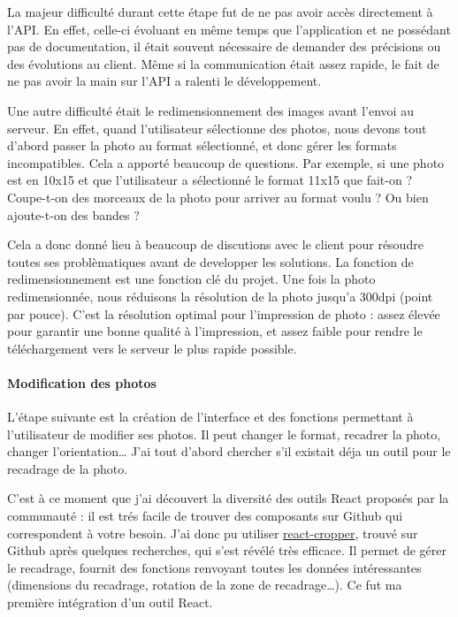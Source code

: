 \documentclass[12pt,a4paper]{article}
\begin{document}
  \bigskip

  La majeur difficulté durant cette étape fut de ne pas avoir accès
  directement à l'API. En effet, celle-ci évoluant en même temps que
  l'application et ne possédant pas de documentation, il était souvent
  nécessaire de demander des précisions ou des évolutions au client. Même
  si la communication était assez rapide, le fait de ne pas avoir la main
  sur l'API a ralenti le développement.

  \bigskip

  Une autre difficulté était le redimensionnement des images avant l'envoi
  au serveur. En effet, quand l'utilisateur sélectionne des photos, nous
  devons tout d'abord passer la photo au format sélectionné, et donc gérer
  les formats incompatibles. Cela a apporté beaucoup de questions. Par
  exemple, si une photo est en 10x15 et que l'utilisateur a sélectionné le
  format 11x15 que fait-on ? Coupe-t-on des morceaux de la photo pour
  arriver au format voulu ? Ou bien ajoute-t-on des bandes ?

  \bigskip

  Cela a donc donné lieu à beaucoup de discutions avec le client pour
  résoudre toutes ses problèmatiques avant de developper les solutions. La
  fonction de redimensionnement est une fonction clé du projet. Une fois
  la photo redimensionnée, nous réduisons la résolution de la photo
  jusqu'a 300dpi (point par pouce). C'est la résolution optimal pour
  l'impression de photo : assez élevée pour garantir une bonne qualité à
  l'impression, et assez faible pour rendre le téléchargement vers le
  serveur le plus rapide possible.

  \bigskip

  \paragraph{Modification des photos}\label{modification-des-photos}

  \bigskip

  L'étape suivante est la création de l'interface et des fonctions
  permettant à l'utilisateur de modifier ses photos. Il peut changer le
  format, recadrer la photo, changer l'orientation\ldots{} J'ai tout
  d'abord chercher s'il existait déja un outil pour le recadrage de la
  photo.

  \bigskip

  C'est à ce moment que j'ai découvert la diversité des outils React
  proposés par la communauté : il est trés facile de trouver des
  composants sur Github qui correspondent à votre besoin. J'ai donc pu
  utiliser
  \href{https://github.com/roadmanfong/react-cropper}{react-cropper},
  trouvé sur Github après quelques recherches, qui s'est révélé très
  efficace. Il permet de gérer le recadrage, fournit des fonctions
  renvoyant toutes les données intéressantes (dimensions du recadrage,
  rotation de la zone de recadrage\ldots{}). Ce fut ma première
  intégration d'un outil React.
\end{document}
